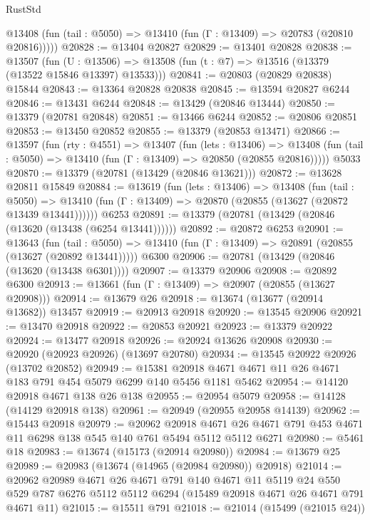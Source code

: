 \begin{lexlean}{RustStd}
\begin{coremodule}
      @13408 (fun (tail : @5050) => @13410 (fun (Γ : @13409) => @20783 (@20810 @20816)))))
@20828 := @13404 @20827
@20829 := @13401 @20828
@20838 := @13507
    (fun (U : @13506) => @13508 (fun (t : @7) => @13516 (@13379 (@13522 @15846 @13397) @13533)))
@20841 := @20803 (@20829 @20838) @15844
@20843 := @13364 @20828 @20838
@20845 := @13594 @20827 @6244
@20846 := @13431 @6244
@20848 := @13429 (@20846 @13444)
@20850 := @13379 (@20781 @20848)
@20851 := @13466 @6244
@20852 := @20806 @20851
@20853 := @13450 @20852
@20855 := @13379 (@20853 @13471)
@20866 := @13597
    (fun (rty : @4551) =>
    @13407
      (fun (lets : @13406) =>
      @13408 (fun (tail : @5050) => @13410 (fun (Γ : @13409) => @20850 (@20855 @20816)))))
    @5033
@20870 := @13379 (@20781 (@13429 (@20846 @13621)))
@20872 := @13628 @20811 @15849
@20884 := @13619
    (fun (lets : @13406) =>
    @13408
      (fun (tail : @5050) =>
      @13410 (fun (Γ : @13409) => @20870 (@20855 (@13627 (@20872 @13439 @13441))))))
    @6253
@20891 := @13379 (@20781 (@13429 (@20846 (@13620 (@13438 (@6254 @13441))))))
@20892 := @20872 @6253
@20901 := @13643
    (fun (tail : @5050) => @13410 (fun (Γ : @13409) => @20891 (@20855 (@13627 (@20892 @13441)))))
    @6300
@20906 := @20781 (@13429 (@20846 (@13620 (@13438 @6301))))
@20907 := @13379 @20906
@20908 := @20892 @6300
@20913 := @13661 (fun (Γ : @13409) => @20907 (@20855 (@13627 @20908)))
@20914 := @13679 @26
@20918 := @13674 (@13677 (@20914 @13682)) @13457
@20919 := @20913 @20918
@20920 := @13545 @20906
@20921 := @13470 @20918
@20922 := @20853 @20921
@20923 := @13379 @20922
@20924 := @13477 @20918
@20926 := @20924 @13626 @20908
@20930 := @20920 (@20923 @20926) (@13697 @20780)
@20934 := @13545 @20922 @20926 (@13702 @20852)
@20949 := @15381 @20918 @4671 @4671 @11 @26 @4671 @183 @791 @454 @5079 @6299 @140 @5456 @1181 @5462
@20954 := @14120 @20918 @4671 @138 @26 @138
@20955 := @20954 @5079
@20958 := @14128 (@14129 @20918 @138)
@20961 := @20949 (@20955 @20958 @14139)
@20962 := @15443 @20918
@20979 := @20962
    @20918
    @4671
    @26
    @4671
    @791
    @453
    @4671
    @11
    @6298
    @138
    @545
    @140
    @761
    @5494
    @5112
    @5112
    @6271
@20980 := @5461 @18
@20983 := @13674 (@15173 (@20914 @20980))
@20984 := @13679 @25
@20989 := @20983 (@13674 (@14965 (@20984 @20980)) @20918)
@21014 := @20962
    @20989
    @4671
    @26
    @4671
    @791
    @140
    @4671
    @11
    @5119
    @24
    @550
    @529
    @787
    @6276
    @5112
    @5112
    @6294
    (@15489 @20918 @4671 @26 @4671 @791 @4671 @11)
@21015 := @15511 @791
@21018 := @21014 (@15499 (@21015 @24))

\end{coremodule}
\end{lexlean}
